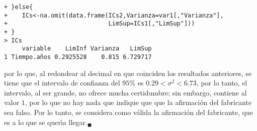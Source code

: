 \begin{solucion}
\begin{verbatim}
+ }else{
+    ICs<-na.omit(data.frame(ICs2,Varianza=var1[,"Varianza"],
+                            LimSup=ICs1[,"LimSup"]))
+ }
> ICs
     variable    LimInf Varianza   LimSup
1 Tiempo.años 0.2925528    0.815 6.729717
 \end{verbatim}
 \vspace{-0.5cm}
 por lo que, al redondear al decimal en que coinciden los resultados anteriores, se tiene que el intervalo de confianza del $95\%$ es $0.29 < \sigma^2 < 6.73$, por lo tanto, el intervalo, al ser grande, no ofrece mucha certidumbre; sin embargo, contiene al valor $1$, por lo que no hay nada que indique que que la afirmaci\'on del fabricante sea falso. Por lo tanto, se considera como v\'alida la afirmaci\'on del fabricante, que es a lo que se quer\'{\i}a llegar.${}_{\blacksquare}$
\end{solucion}
